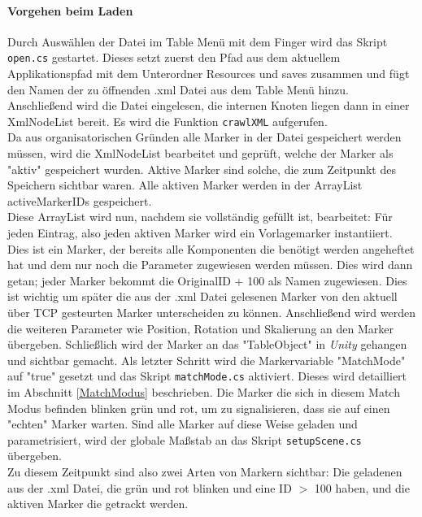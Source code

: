 \paragraph{Vorgehen beim Laden} Durch Auswählen der Datei im Table Menü mit dem Finger wird das Skript \texttt{open.cs} gestartet. Dieses setzt zuerst den Pfad aus dem aktuellem Applikationspfad mit dem Unterordner Resources und saves zusammen und fügt den Namen der zu öffnenden .xml Datei aus dem Table Menü hinzu. Anschließend wird die Datei eingelesen, die internen Knoten liegen dann in einer XmlNodeList bereit. Es wird die Funktion \texttt{crawlXML} aufgerufen.\\
Da aus organisatorischen Gründen alle Marker in der Datei gespeichert werden müssen, wird die XmlNodeList bearbeitet und geprüft, welche der Marker als "aktiv" gespeichert wurden. Aktive Marker sind solche, die zum Zeitpunkt des Speichern sichtbar waren. Alle aktiven Marker werden in der ArrayList activeMarkerIDs gespeichert.\\
Diese ArrayList wird nun, nachdem sie vollständig gefüllt ist, bearbeitet: Für jeden Eintrag, also jeden aktiven Marker wird ein Vorlagemarker instantiiert. Dies ist ein Marker, der bereits alle Komponenten die benötigt werden angeheftet hat und dem nur noch die Parameter zugewiesen werden müssen. Dies wird dann getan; jeder Marker bekommt die OriginalID + 100 als Namen zugewiesen. Dies ist wichtig um später die aus der .xml Datei gelesenen Marker von den aktuell über TCP gesteurten Marker unterscheiden zu können. Anschließend wird werden die weiteren Parameter wie Position, Rotation und Skalierung an den Marker übergeben. Schließlich wird der Marker an das "TableObject" in \textit{Unity} gehangen und sichtbar gemacht. Als letzter Schritt wird die Markervariable "MatchMode" auf "true" gesetzt und das Skript \texttt{matchMode.cs} aktiviert. Dieses wird detailliert im Abschnitt \ref{MatchModus} beschrieben. Die Marker die sich in diesem Match Modus befinden blinken grün und rot, um zu signalisieren, dass sie auf einen "echten" Marker warten.
Sind alle Marker auf diese Weise geladen und parametrisiert, wird der globale Maßstab an das Skript \texttt{setupScene.cs} übergeben.\\
Zu diesem Zeitpunkt sind also zwei Arten von Markern sichtbar: Die geladenen aus der .xml Datei, die grün und rot blinken und eine ID $>$ 100 haben, und die aktiven Marker die getrackt werden.



